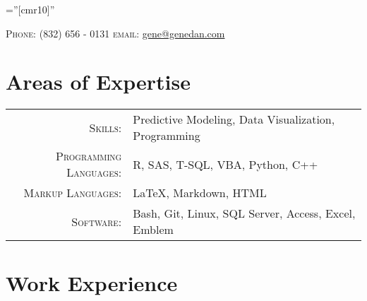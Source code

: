 \documentclass[10pt]{article} %
\begin{document}
\pagestyle{empty} %

\font\fb=''[cmr10]'' %


\par{\par} %

\begin{center}
\textsc{Phone:}  (832) 656 - 0131 \qquad
\textsc{email:}  \href{mailto:gene@genedan.com}{gene@genedan.com}
\end{center}



\section{Areas of Expertise}
\begin{tabular}{r|p{10cm}}
\textsc{Skills: } & Predictive Modeling, Data Visualization, Programming\\
\textsc{Programming Languages: } & R, SAS, T-SQL, VBA, Python, C++\\
\textsc{Markup Languages: } & \LaTeX, Markdown, HTML\\
\textsc{Software: } & Bash, Git, Linux, SQL Server, Access, Excel, Emblem\\
\end{tabular}


\section{Work Experience}
\end{document}
